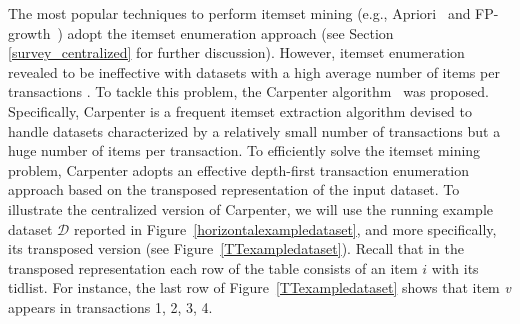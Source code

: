 The most popular techniques to perform itemset mining (e.g.,
Apriori~\cite{Agr94} and FP-growth~\cite{Han00}) adopt the itemset enumeration
approach (see Section \ref{survey_centralized} for further discussion).
However, itemset enumeration revealed to be ineffective with datasets with a
high average number of items per transactions \cite{Zaki_Carpenter}.
To tackle this problem, the Carpenter algorithm~\cite{Zaki_Carpenter} was
proposed.
Specifically, Carpenter is a frequent itemset extraction algorithm devised to
handle datasets characterized by a relatively small number of
transactions but a huge number of items per transaction.
To efficiently solve the itemset mining problem, Carpenter adopts an effective
depth-first transaction enumeration approach based on the transposed
representation of the input dataset.
To illustrate the centralized version of Carpenter, we will use the running
example dataset $\mathcal{D}$ reported in Figure~\ref{horizontalexampledataset},
and
more specifically, its transposed version (see Figure~\ref{TTexampledataset}).
Recall that in the transposed
representation each row of the table consists of an item $i$ with its tidlist.
For instance,
the last row of Figure~\ref{TTexampledataset} shows that item \textit{v}
appears in
transactions 1, 2, 3, 4.



